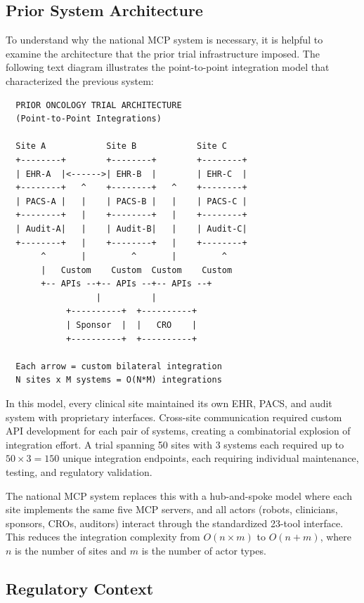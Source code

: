 \documentclass{article}
\begin{document}
\subsection{Prior System Architecture}

To understand why the national MCP system is necessary, it is helpful to examine the architecture that the prior trial infrastructure imposed. The following text diagram illustrates the point-to-point integration model that characterized the previous system:

\begin{verbatim}
  PRIOR ONCOLOGY TRIAL ARCHITECTURE
  (Point-to-Point Integrations)

  Site A            Site B            Site C
  +--------+        +--------+        +--------+
  | EHR-A  |<------>| EHR-B  |        | EHR-C  |
  +--------+   ^    +--------+   ^    +--------+
  | PACS-A |   |    | PACS-B |   |    | PACS-C |
  +--------+   |    +--------+   |    +--------+
  | Audit-A|   |    | Audit-B|   |    | Audit-C|
  +--------+   |    +--------+   |    +--------+
       ^       |         ^       |         ^
       |   Custom    Custom  Custom    Custom
       +-- APIs --+-- APIs --+-- APIs --+
                  |          |
            +----------+  +----------+
            | Sponsor  |  |   CRO    |
            +----------+  +----------+

  Each arrow = custom bilateral integration
  N sites x M systems = O(N*M) integrations
\end{verbatim}

In this model, every clinical site maintained its own EHR, PACS, and audit system with proprietary interfaces. Cross-site communication required custom API development for each pair of systems, creating a combinatorial explosion of integration effort. A trial spanning 50 sites with 3 systems each required up to $50 \times 3 = 150$ unique integration endpoints, each requiring individual maintenance, testing, and regulatory validation.

The national MCP system replaces this with a hub-and-spoke model where each site implements the same five MCP servers, and all actors (robots, clinicians, sponsors, CROs, auditors) interact through the standardized 23-tool interface. This reduces the integration complexity from $O(n \times m)$ to $O(n + m)$, where $n$ is the number of sites and $m$ is the number of actor types.

\subsection{Regulatory Context}
\end{document}

